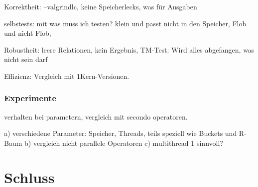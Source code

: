 \documentclass[a4paper,12pt,twoside]{article}
\begin{document}
Korrektheit:
--valgrindlc, keine Speicherlecks, was für Ausgaben

selbstests: mit was muss ich testen? klein und passt nicht in den Speicher, Flob und nicht Flob, 

Robustheit: leere Relationen, kein Ergebnis, TM-Test: Wird alles abgefangen, was nicht sein darf

Effizienz: Vergleich mit 1Kern-Versionen.


\subsubsection{Experimente}
verhalten bei parametern, vergleich mit secondo operatoren.

a) verschiedene Parameter: Speicher, Threads, teils speziell wie Buckets und R-Baum 
b) vergleich nicht parallele Operatoren
c) multithread 1 sinnvoll?

\section{Schluss}

\pagebreak 
\printbibliography
\end{document}
